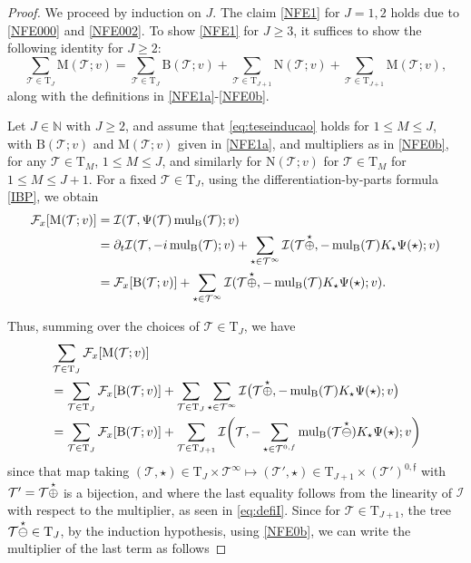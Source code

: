 \documentclass[a4paper,
11pt,  reqno]{amsart}
\makeatletter
\newcommand{\5}{\textup{V}}
\newcommand{\noi}{\noindent}
\newcommand{\dt}{\partial_t}
\theoremstyle{remark}
\newcommand{\TT}{\mathcal{T}}
\newcommand{\Tr}{\mathrm{T}}
\newcommand{\Ft}{{\mathcal{F}}}
\newcommand{\ff}{\mathfrak{f}}
\newcommand{\N}{\mathbb{N}}
\DeclareMathOperator{\mulB}{mul_{\BB}}
\def\<#1>{\csname MH@symb@#1\endcsname}
\newcommand{\Ical}{\mathcal{I}}
\numberwithin{equation}{section}
\numberwithin{theorem}{section}
\newcommand{\MM}{\mathrm{M}}
\newcommand{\NN}{\mathrm{N}}
\newcommand{\BB}{\mathrm{B}}
\makeatother
\begin{document}
\begin{proof}



We proceed by induction on $J$. 
The claim \eqref{NFE1} for $J=1,2$ holds due to \eqref{NFE000} and \eqref{NFE002}.
To show \eqref{NFE1} for $J\ge3$, it suffices to show the following identity for $J\ge 2$:
\begin{equation}\label{eq:teseinducao}
\sum_{\TT\in\Tr_{J}} \MM(\TT; v) 
= 
\sum_{\TT\in \Tr_{J}} \BB(\TT; v) 
+
\sum_{\TT\in \Tr_{J+1}} \NN(\TT; v) 
+ \sum_{\TT\in \Tr_{J+1}} \MM(\TT; v),
\end{equation}
along with the definitions in \eqref{NFE1a}-\eqref{NFE0b}. 


Let $J\in \N$ with $J\ge2$, and assume that \eqref{eq:teseinducao} holds for $1\le M \le J$, 
with $\BB(\TT; v)$ and $\MM(\TT; v)$ given in \eqref{NFE1a}, and multipliers as in \eqref{NFE0b}, for any $\TT\in \Tr_M$, $1\le M \le J$, and similarly for $\NN(\TT; v)$ for $\TT\in \Tr_M$ for $1\le M \le J+1$.
For a fixed $\TT\in\Tr_{J}$, using the differentiation-by-parts formula \eqref{IBP}, we obtain
\begin{align*}
\Ft_x [\MM(\TT; v) ]
&
=\Ical(\TT, \Psi(\TT)\mulB(\TT); v)
\\
& =
\dt\Ical(\TT, -i \mulB(\TT); v) +
\sum_{\star\in\TT^\infty}
\Ical (\TT \overset{\star}{\oplus} \<1>, -\mulB(\TT) K_\star \Psi(\star) ; v )
\\
&
= \Ft_x[\BB(\TT; v) ]  
+
\sum_{\star\in\TT^\infty} \Ical (\TT \overset{\star}{\oplus} \<1>, -\mulB(\TT) K_\star \Psi(\star) ; v).
\end{align*}



\noi
Thus, summing over the choices of $\TT \in \Tr_{J}$, we have
\begin{align}
\label{mul2a}
\begin{split}
&
\sum_{\TT\in \Tr_{J}} \Ft_x [\MM(\TT; v) ]
\\
&
= \sum_{\TT\in \Tr_{J}} \Ft_x[\BB(\TT; v) ]
+
\sum_{\TT\in \Tr_{J}}
\sum_{\star\in\TT^\infty}
\Ical 
\big(\TT \overset{\star}{\oplus} \<1>,
-\mulB(\TT) K_\star \Psi(\star);  v \big) 
\\
&
=
 \sum_{\TT\in \Tr_{J}} \Ft_x[\BB(\TT; v) ]
+
\sum_{\TT\in \Tr_{J+1}}
\Ical 
\bigg(\TT,
-\sum_{\star\in\TT^{0,f}}
\mulB(\TT \overset{\star}{\ominus}  \<1> ) K_\star \Psi(\star) ;
v
\bigg) 
\end{split}
\end{align}
since that map taking $(\TT, \star) \in \Tr_J \times \TT^\infty \mapsto (\TT', \star) \in \Tr_{J+1} \times (\TT')^{0,\ff}$ with $\TT' = \TT \overset{\star}{\oplus} \<1>$ is a bijection, and  
where the last equality follows from the linearity of $\Ical$ with respect to the multiplier, as seen in \eqref{eq:defiI}. Since for $\TT\in \Tr_{J+1}$, the tree $\TT \overset{\star}{\ominus} \<1>\in \Tr_{J}$, by the induction hypothesis, using \eqref{NFE0b}, we can write the multiplier of the last term as follows


\end{proof}
\end{document}
